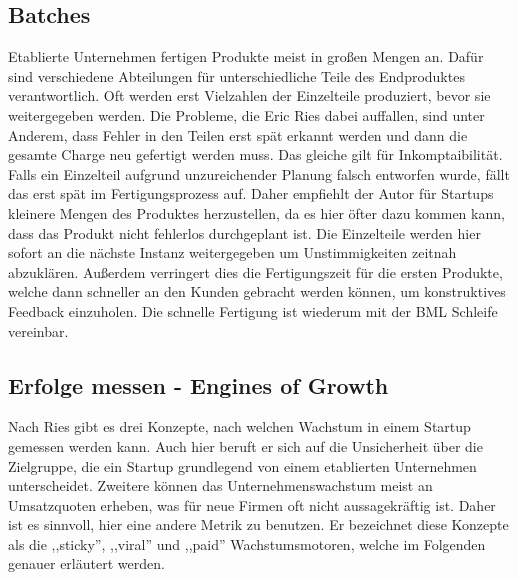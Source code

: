 \subsection*{\label{sec:LeanStartup-Batches}\thesubsection\quad Batches}
Etablierte Unternehmen fertigen Produkte meist in großen Mengen an. Dafür sind verschiedene Abteilungen für unterschiedliche Teile des Endproduktes verantwortlich. Oft werden erst Vielzahlen der Einzelteile produziert, bevor sie weitergegeben werden. Die Probleme, die Eric Ries dabei auffallen, sind unter Anderem, dass Fehler in den Teilen erst spät erkannt werden und dann die gesamte Charge neu gefertigt werden muss. Das gleiche gilt für Inkomptaibilität. Falls ein Einzelteil aufgrund unzureichender Planung falsch entworfen wurde, fällt das erst spät im Fertigungsprozess auf. Daher empfiehlt der Autor für Startups kleinere Mengen des Produktes herzustellen, da es hier öfter dazu kommen kann, dass das Produkt nicht fehlerlos durchgeplant ist. Die Einzelteile werden hier sofort an die nächste Instanz weitergegeben um Unstimmigkeiten zeitnah abzuklären. Außerdem verringert dies die Fertigungszeit für die ersten Produkte, welche dann schneller an den Kunden gebracht werden können, um konstruktives Feedback einzuholen. Die schnelle Fertigung ist wiederum mit der \ac{BML} Schleife vereinbar.

\subsection*{\label{sec:LeanStartup-EnginesOfGrowth}\thesubsection\quad Erfolge messen - Engines of Growth}
Nach Ries gibt es drei Konzepte, nach welchen Wachstum in einem Startup gemessen werden kann. Auch hier beruft er sich auf die Unsicherheit über die Zielgruppe, die ein Startup grundlegend von einem etablierten Unternehmen unterscheidet. Zweitere können das Unternehmenswachstum meist an Umsatzquoten erheben, was für neue Firmen oft nicht aussagekräftig ist. Daher ist es sinnvoll, hier eine andere Metrik zu benutzen. Er bezeichnet diese Konzepte als die ,,sticky'', ,,viral'' und ,,paid'' Wachstumsmotoren, welche im Folgenden genauer erläutert werden.

